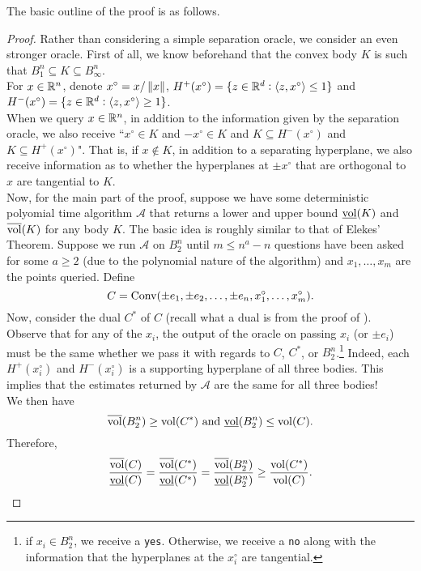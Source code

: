 The basic outline of the proof is as follows.\\

\begin{proof}
	Rather than considering a simple separation oracle, we consider an even stronger oracle. First of all, we know beforehand that the convex body $K$ is such that $B_1^n\subseteq K\subseteq B_\infty^n$.\\
	For $x\in\mathbb{R}^n$, denote $x^\circ = x/\left\lVert x\right\rVert$, $H^+(x^\circ) = \{ z\in\mathbb{R}^d:\langle z,x^\circ \rangle \leq 1 \}$ and $H^-(x^\circ) = \{ z\in\mathbb{R}^d:\langle z,x^\circ \rangle \geq 1 \}$.\\

	When we query $x\in\mathbb{R}^n$, in addition to the information given by the separation oracle, we also receive ``$x^\circ\in K$ and $-x^\circ\in K$ and $K\subseteq H^-(x^\circ)$ and $K\subseteq H^+(x^\circ)$". That is, if $x\not\in K$, in addition to a separating hyperplane, we also receive information as to whether the hyperplanes at $\pm x^\circ$ that are orthogonal to $x$ are tangential to $K$.\\

	Now, for the main part of the proof, suppose we have some deterministic polyomial time algorithm $\mathcal{A}$ that returns a lower and upper bound $\underline{\operatorname{vol}}(K)$ and $\overline{\operatorname{vol}}(K)$ for any body $K$. The basic idea is roughly similar to that of Elekes' Theorem. Suppose we run $\mathcal{A}$ on $B_2^n$ until $m\leq n^a - n$ questions have been asked for some $a\geq 2$ (due to the polynomial nature of the algorithm) and $x_1,\ldots,x_m$ are the points queried. Define
	\[ C = \operatorname{Conv}(\pm e_1, \pm e_2, \ldots, \pm e_n, x_1^\circ, \ldots, x_m^\circ). \]
	Now, consider the dual $C^*$ of $C$ (recall what a dual is from the proof of ). Observe that for any of the $x_i$, the output of the oracle on passing $x_i$ (or $\pm e_i$) must be the same whether we pass it with regards to $C$, $C^*$, or $B_2^n$.\footnote{if $x_i\in B_2^n$, we receive a \texttt{yes}. Otherwise, we receive a \texttt{no} along with the information that the hyperplanes at the $x_i^\circ$ are tangential.} Indeed, each $H^+(x_i^\circ)$ and $H^-(x_i^\circ)$ is a supporting hyperplane of all three bodies. This implies that the estimates returned by $\mathcal{A}$ are the same for all three bodies!\\
	We then have
	\[ \overline{\operatorname{vol}}(B_2^n) \geq \operatorname{vol}(C^*)\text{ and }\underline{\operatorname{vol}}(B_2^n) \leq \operatorname{vol}(C). \]
	Therefore,
	\[ \frac{\overline{\operatorname{vol}}(C)}{\underline{\operatorname{vol}}(C)} = \frac{\overline{\operatorname{vol}}(C^*)}{\underline{\operatorname{vol}}(C^*)} = \frac{\overline{\operatorname{vol}}(B_2^n)}{\underline{\operatorname{vol}}(B_2^n)} \geq \frac{\operatorname{vol}(C^*)}{\operatorname{vol}(C)}. \]
\end{proof}

